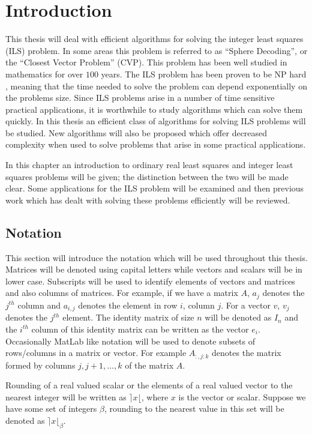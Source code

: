 \documentclass[12pt,Bold,letterpaper]{mcgilletdclass}
\begin{document}
 
\chapter{Introduction}

This thesis will deal with efficient algorithms for solving the integer least squares (ILS) problem. In some areas this problem is referred to as ``Sphere Decoding'', or the ``Closest Vector Problem'' (CVP). This problem has been well studied in mathematics for over $100$ years. The ILS problem has been proven to be NP hard \cite{Mic01}, meaning that the time needed to solve the problem can depend exponentially on the problems size. Since ILS problems arise in a number of time sensitive practical applications, it is worthwhile to study algorithms which can solve them quickly. In this thesis an efficient class of algorithms for solving ILS problems will be studied. New algorithms will also be proposed which offer decreased complexity when used to solve problems that arise in some practical applications.

In this chapter an introduction to ordinary real least squares and integer least squares problems will be given; the distinction between the two will be made clear. Some applications for the ILS problem will be examined and then previous work which has dealt with solving these problems efficiently will be reviewed. 

\section{Notation}

This section will introduce the notation which will be used throughout this thesis. Matrices will be denoted using capital letters while vectors and scalars will be in lower case. Subscripts will be used to identify elements of vectors and matrices and also columns of matrices. For example, if we have a matrix $A$, $a_j$ denotes the $j^{th}$ column and $a_{i,j}$ denotes the element in row $i$, column $j$. For a vector $v$, $v_j$ denotes the $j^{th}$ element. The identity matrix of size $n$ will be denoted as $I_n$ and the $i^{th}$ column of this identity matrix can be written as the vector $e_i$. Occasionally MatLab like notation will be used to denote subsets of rows/columns in a matrix or vector. For example $A_{:,j:k}$ denotes the matrix formed by columns $j, j+1, \dots, k$ of the matrix $A$.

Rounding of a real valued scalar or the elements of a real valued vector to the nearest integer will be written as $\rceil x \lfloor$, where $x$ is the vector or scalar. Suppose we have some set of integers $\beta$, rounding to the nearest value in this set will be denoted as  $\rceil x \lfloor_{\beta}$.
\end{document}
